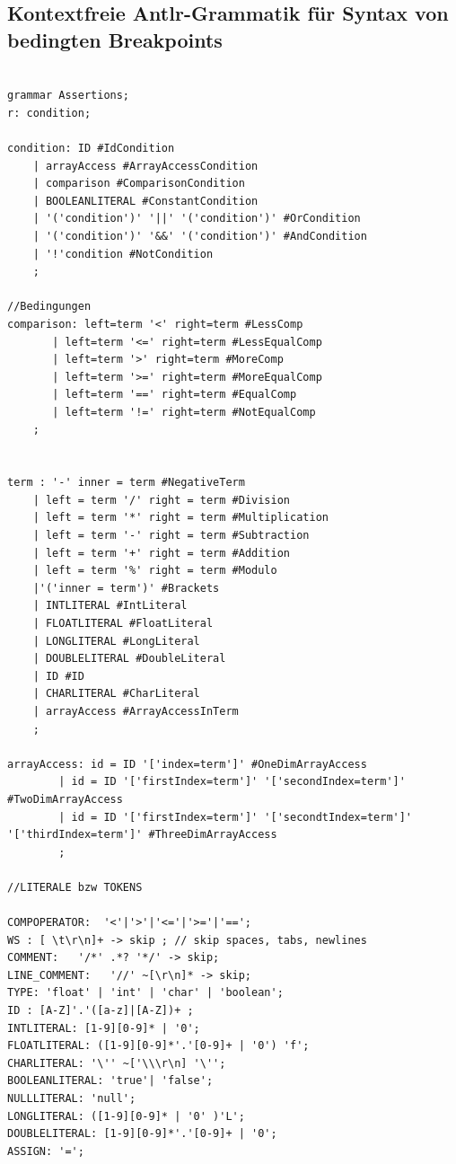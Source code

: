 \documentclass[parskip=full]{scrartcl}
\begin{document}
\subsection{Kontextfreie Antlr-Grammatik für Syntax von bedingten Breakpoints}
\begin{verbatim}

grammar Assertions;
r: condition;

condition: ID #IdCondition
	| arrayAccess #ArrayAccessCondition
	| comparison #ComparisonCondition
	| BOOLEANLITERAL #ConstantCondition
	| '('condition')' '||' '('condition')' #OrCondition
	| '('condition')' '&&' '('condition')' #AndCondition
	| '!'condition #NotCondition
	;

//Bedingungen
comparison: left=term '<' right=term #LessComp
	   | left=term '<=' right=term #LessEqualComp
	   | left=term '>' right=term #MoreComp
	   | left=term '>=' right=term #MoreEqualComp
	   | left=term '==' right=term #EqualComp
	   | left=term '!=' right=term #NotEqualComp
	;


term : '-' inner = term #NegativeTerm
    | left = term '/' right = term #Division
	| left = term '*' right = term #Multiplication
	| left = term '-' right = term #Subtraction
	| left = term '+' right = term #Addition
	| left = term '%' right = term #Modulo
	|'('inner = term')' #Brackets
    | INTLITERAL #IntLiteral
	| FLOATLITERAL #FloatLiteral
	| LONGLITERAL #LongLiteral
	| DOUBLELITERAL #DoubleLiteral
	| ID #ID
	| CHARLITERAL #CharLiteral
	| arrayAccess #ArrayAccessInTerm
	;

arrayAccess: id = ID '['index=term']' #OneDimArrayAccess
		| id = ID '['firstIndex=term']' '['secondIndex=term']' #TwoDimArrayAccess
		| id = ID '['firstIndex=term']' '['secondtIndex=term']' '['thirdIndex=term']' #ThreeDimArrayAccess
		;

//LITERALE bzw TOKENS

COMPOPERATOR:  '<'|'>'|'<='|'>='|'==';
WS : [ \t\r\n]+ -> skip ; // skip spaces, tabs, newlines
COMMENT:   '/*' .*? '*/' -> skip;
LINE_COMMENT:   '//' ~[\r\n]* -> skip;
TYPE: 'float' | 'int' | 'char' | 'boolean';
ID : [A-Z]'.'([a-z]|[A-Z])+ ;
INTLITERAL: [1-9][0-9]* | '0';
FLOATLITERAL: ([1-9][0-9]*'.'[0-9]+ | '0') 'f';
CHARLITERAL: '\'' ~['\\\r\n] '\'';
BOOLEANLITERAL:	'true'|	'false';
NULLLITERAL: 'null';
LONGLITERAL: ([1-9][0-9]* | '0' )'L';
DOUBLELITERAL: [1-9][0-9]*'.'[0-9]+ | '0';
ASSIGN: '=';
\end{verbatim}
\end{document}
